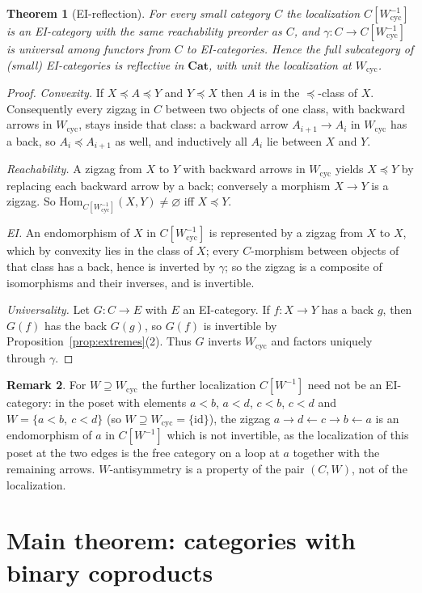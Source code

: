 \documentclass[11pt]{amsart}
\newtheorem{thm}{Theorem}[section]
\theoremstyle{definition}
\newtheorem{rem}[thm]{Remark}
\newcommand{\Hom}{\mathrm{Hom}}
\newcommand{\Wcyc}{W_{\mathrm{cyc}}}
\newcommand{\Cat}{\mathbf{Cat}}
\begin{document}
\begin{thm}[EI-reflection]\label{thm:EI}
For every small category $C$ the localization $C[\Wcyc^{-1}]$ is an
EI-category with the same reachability preorder as $C$, and
$\gamma\colon C\to C[\Wcyc^{-1}]$ is universal among functors from $C$ to
EI-categories. Hence the full subcategory of (small) EI-categories is reflective in
$\Cat$, with unit the localization at $\Wcyc$.
\end{thm}
\begin{proof}
\emph{Convexity.} If $X\preceq A\preceq Y$ and $Y\preceq X$ then $A$ is in the
$\preceq$-class of $X$. Consequently every zigzag in $C$ between two objects
of one class, with backward arrows in $\Wcyc$, stays inside that class: a
backward arrow $A_{i+1}\to A_i$ in $\Wcyc$ has a back, so $A_i\preceq A_{i+1}$
as well, and inductively all $A_i$ lie between $X$ and $Y$.

\emph{Reachability.} A zigzag from $X$ to $Y$ with backward arrows in $\Wcyc$
yields $X\preceq Y$ by replacing each backward arrow by a back; conversely a
morphism $X\to Y$ is a zigzag. So $\Hom_{C[\Wcyc^{-1}]}(X,Y)\neq\varnothing$ iff
$X\preceq Y$.

\emph{EI.} An endomorphism of $X$ in $C[\Wcyc^{-1}]$ is represented by a
zigzag from $X$ to $X$, which by convexity lies in the class of $X$; every
$C$-morphism between objects of that class has a back, hence is inverted by
$\gamma$; so the zigzag is a composite of isomorphisms and their inverses,
and is invertible.

\emph{Universality.} Let $G\colon C\to E$ with $E$ an EI-category. If
$f\colon X\to Y$ has a back $g$, then $G(f)$ has the back $G(g)$, so $G(f)$ is
invertible by Proposition~\ref{prop:extremes}(2). Thus $G$ inverts $\Wcyc$ and
factors uniquely through $\gamma$.
\end{proof}

\begin{rem}
For $W\supseteq\Wcyc$ the further localization $C[W^{-1}]$ need not be an
EI-category: in the poset with elements $a<b$, $a<d$, $c<b$, $c<d$ and
$W=\{a<b,\ c<d\}$ (so $W\supseteq\Wcyc=\{\mathrm{id}\}$), the zigzag
$a\to d\leftarrow c\to b\leftarrow a$ is an endomorphism of $a$ in
$C[W^{-1}]$ which is not invertible, as the localization of this poset at
the two edges is the free category on a loop at $a$ together with the
remaining arrows. $W$-antisymmetry is a property of the pair $(C,W)$, not of
the localization.
\end{rem}

\section{Main theorem: categories with binary coproducts}\label{sec:main}
\end{document}

